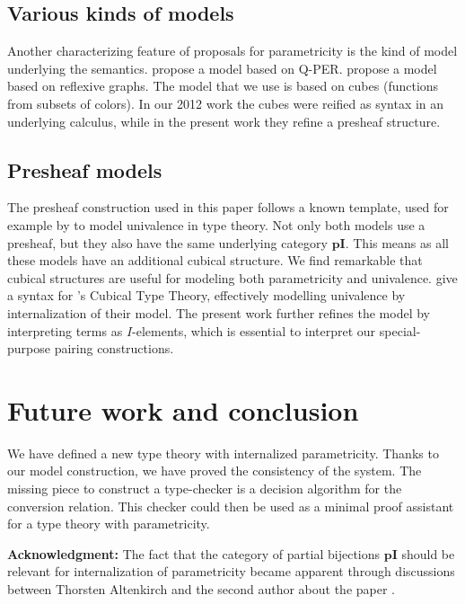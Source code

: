 \documentclass[english]{PaperTools/latex/lipics}
\def\pI{\ensuremath{\mathbf{pI}}}
\begin{document}
\subsection{Various kinds of models}
Another characterizing feature of proposals for parametricity is the
kind of model underlying the
semantics.  propose a model
based on Q-PER.  propose a model based
on reflexive graphs. The model that we use is based on cubes
(functions from subsets of colors). In
our 2012 work the cubes were reified as syntax in
an underlying calculus, while in the present work they refine a presheaf structure.

\subsection{Presheaf models}

The presheaf construction used in this paper follows a known template,
used for example by \citet{bezem2014model,DBLP:journals/corr/Pitts14}
to model univalence in type theory. Not only both models use a
presheaf, but they also have the same underlying category $\pI$.
This means as all these models have an additional cubical structure.
We find remarkable that cubical structures are useful for modeling both
parametricity and univalence.
\cite{altenkirch2014syntax} give a syntax for
\citeauthor{bezem2014model}'s Cubical Type Theory, effectively modelling
univalence by internalization of their model.
The present work further refines the model by interpreting terms as
$I$-elements, which is essential to interpret our special-purpose
pairing constructions.

\section{Future work and conclusion}
We have defined a new type theory with internalized parametricity.
Thanks to our model construction, we have proved the consistency of
the system. The missing piece to construct a type-checker is a
decision algorithm for the conversion relation.  This checker could
then be used as a minimal proof assistant for a type theory with
parametricity.

\bigskip
\noindent
\textbf{Acknowledgment:}
The fact that the category of partial bijections \pI{} should be
relevant for internalization of parametricity became apparent through
discussions between Thorsten Altenkirch and the second  author about
the paper \citep{bernardy_computational_2012}.



\end{document}
